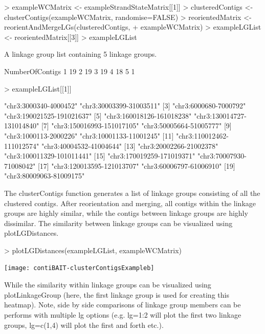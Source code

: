 \documentclass{article}
\begin{document}
\begin{Schunk}
\begin{Sinput}
> exampleWCMatrix <- exampleStrandStateMatrix[[1]]
> clusteredContigs <- clusterContigs(exampleWCMatrix, randomise=FALSE)
> reorientedMatrix <- reorientAndMergeLGs(clusteredContigs,
+  exampleWCMatrix)
> exampleLGList <- reorientedMatrix[[3]]
> exampleLGList
\end{Sinput}
\begin{Soutput}
A linkage group list containing 5 linkage groups.

  NumberOfContigs
1              19
2              19
3              19
4              18
5               1
\end{Soutput}
\begin{Sinput}
> exampleLGList[[1]]
\end{Sinput}
\begin{Soutput}
 [1] "chr3:3000340-4000452"     "chr3:30003399-31003511"  
 [3] "chr3:6000680-7000792"     "chr3:190021525-191021637"
 [5] "chr3:160018126-161018238" "chr3:130014727-131014840"
 [7] "chr3:150016993-151017105" "chr3:50005664-51005777"  
 [9] "chr3:1000113-2000226"     "chr3:10001133-11001245"  
[11] "chr3:110012462-111012574" "chr3:40004532-41004644"  
[13] "chr3:20002266-21002378"   "chr3:100011329-101011441"
[15] "chr3:170019259-171019371" "chr3:70007930-71008042"  
[17] "chr3:120013595-121013707" "chr3:60006797-61006910"  
[19] "chr3:80009063-81009175"  
\end{Soutput}
\end{Schunk}


The clusterContigs function generates a list of linkage groups consisting of all the clustered contigs.  After reorientation and merging, all contigs within the linkage groups are highly similar, while the contigs between linkage groups are highly dissimilar.  The similarity between linkage groups can be visualized using plotLGDistances.

\begin{Schunk}
\begin{Sinput}
> plotLGDistances(exampleLGList, exampleWCMatrix)
\end{Sinput}
\end{Schunk}
\texttt{[image: contiBAIT-clusterContigsExampleb]}


While the similarity within linkage groups can be visualized using plotLinkageGroup (here, the first linkage group is used for creating this heatmap). Note, side by side comparisons of linkage group members can be performs with multiple lg options (e.g. lg=1:2 will plot the first two linkage groups, lg=c(1,4) will plot the first and forth etc.).
\end{document}
